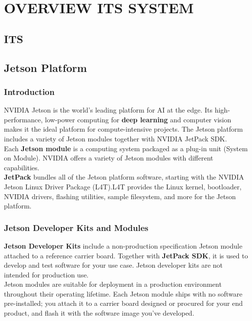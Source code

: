 \chapter{OVERVIEW ITS SYSTEM}

\renewcommand{\headrulewidth}{0.5pt}
\renewcommand{\footrulewidth}{0.5pt}
\thispagestyle{plain}
\pagestyle{fancy}
\fancyhf{}
\raggedright
{}

\section{ITS}

\section{Jetson Platform}

    \subsection{Introduction}
        NVIDIA \textregistered Jetson \texttrademark is the world's leading platform for AI at the edge. 
        Its high-performance, low-power computing for \textbf{deep learning} and computer vision makes it the ideal 
        platform for compute-intensive projects. The Jetson platform includes a variety of Jetson modules 
        together with NVIDIA JetPack \texttrademark SDK. \\ 
        \vspace{3mm}
        Each \textbf{Jetson module} is a computing system packaged as a plug-in unit (System on Module). NVIDIA offers a 
        variety of Jetson modules with different capabilities. \\ 
        \vspace{3mm}
        \textbf{JetPack} bundles all of the Jetson platform software, starting with the NVIDIA \textregistered Jetson \texttrademark 
        Linux Driver Package (L4T).L4T provides the Linux kernel, bootloader, NVIDIA drivers, flashing utilities, sample filesystem, 
        and more for the Jetson platform.
    \subsection{Jetson Developer Kits and Modules}
        \textbf{Jetson Developer Kits} include a non-production specification Jetson module attached to a reference carrier board. 
        Together with \textbf{JetPack SDK}, it is used to develop and test software for your use case. Jetson developer kits are not intended 
        for production use. \\ 
        \vspace{3mm}
        Jetson modules are suitable for deployment in a production environment throughout their operating lifetime. Each Jetson module ships 
        with no software pre-installed; you attach it to a carrier board designed or procured for your end product, and flash it with the software 
        image you’ve developed.
